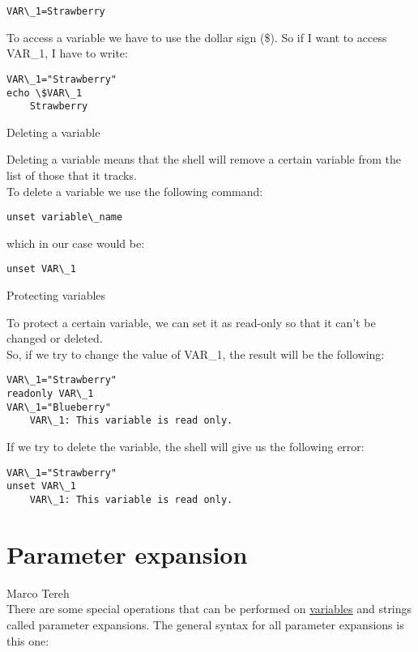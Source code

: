 \documentclass[hidelinks,12pt,a4paper,numbers=enddot]{scrartcl}
\begin{document}
\begin{verbatim}
VAR\_1=Strawberry
\end{verbatim}


To access a variable we have to use the dollar sign (\$). So if I want to
access VAR\_1, I have to write:

\begin{verbatim}
VAR\_1="Strawberry"
echo \$VAR\_1
    Strawberry
\end{verbatim}


Deleting a variable

Deleting a variable means that the shell will remove a certain variable from the list of
those that it tracks.\\
To delete a variable we use the following command:

\begin{verbatim}
unset variable\_name
\end{verbatim}

which in our case would be:

\begin{verbatim}
unset VAR\_1
\end{verbatim}


Protecting variables

To protect a certain variable, we can set it as read-only so that it can't be
changed or deleted.\\
So, if we try to change the value of VAR\_1, the result will be the following:

\begin{verbatim}
VAR\_1="Strawberry"
readonly VAR\_1
VAR\_1="Blueberry"
    VAR\_1: This variable is read only.
\end{verbatim}

If we try to delete the variable, the shell will give us the following error:

\begin{verbatim}
VAR\_1="Strawberry"
unset VAR\_1
    VAR\_1: This variable is read only.
\end{verbatim}

\section{Parameter expansion}


\large Marco Tereh \normalsize\\



There are some special operations that can be performed on
\underline{\href{variables.html}{variables}} and strings called parameter expansions.
The general syntax for all parameter expansions is this one:
\end{document}

